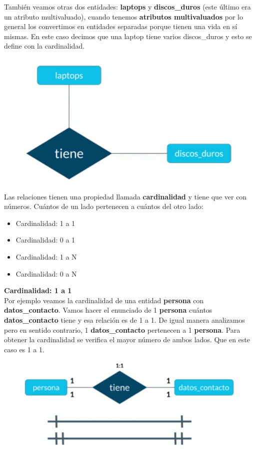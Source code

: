 \documentclass{article}
\begin{document}
También veamos otras dos entidades: \textbf{laptops} y \textbf{discos\_duros}
(este último era un atributo multivaluado), cuando tenemos \textbf{atributos
multivaluados} por lo general los convertimos en entidades separadas porque
tienen una vida en sí mismas. En este caso decimos que una laptop tiene varios
discos\_duros y esto se define con la cardinalidad.\\

\begin{figure}[h!]
    \centering
      \includegraphics[scale=0.40]{./Pictures/012_relacion_tiene.png}
\end{figure}

Las relaciones tienen una propiedad llamada \textbf{cardinalidad} y tiene que
ver con números. Cuántos de un lado pertenecen a cuántos del otro lado:

\begin{itemize}
  \item Cardinalidad: 1 a 1
  \item Cardinalidad: 0 a 1
  \item Cardinalidad: 1 a N
  \item Cardinalidad: 0 a N
\end{itemize}

\textbf{Cardinalidad: 1 a 1}\\
Por ejemplo veamos la cardinalidad de una entidad \textbf{persona} con
\textbf{datos\_contacto}. Vamos hacer el enunciado de 1 \textbf{persona}
cuántos \textbf{datos\_contacto} tiene y esa relación es de 1 a 1. De igual
manera analizamos pero en sentido contrario, 1 \textbf{datos\_contacto}
pertenecen a 1 \textbf{persona}. Para obtener la cardinalidad se verifica el
mayor número de ambos lados. Que en este caso es 1 a 1.

\begin{figure}[h!]
    \centering
      \includegraphics[scale=0.45]{./Pictures/014_card_1_1.png}
\end{figure}
\end{document}
